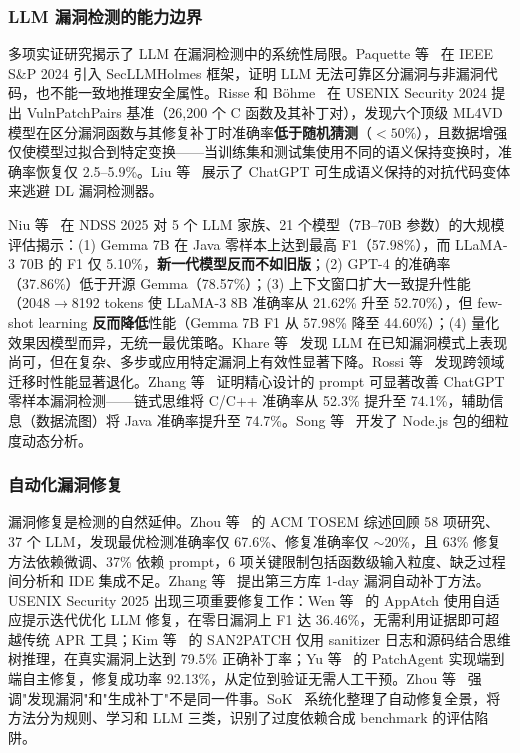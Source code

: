 \documentclass[11pt,a4paper,onecolumn]{article}
\begin{document}
\subsubsection{LLM 漏洞检测的能力边界}
多项实证研究揭示了 LLM 在漏洞检测中的系统性局限。Paquette 等~\cite{paquette2024llmscannot} 在 IEEE S\&P 2024 引入 SecLLMHolmes 框架，证明 LLM 无法可靠区分漏洞与非漏洞代码，也不能一致地推理安全属性。Risse 和 Böhme~\cite{risse2024limits} 在 USENIX Security 2024 提出 VulnPatchPairs 基准（26,200 个 C 函数及其补丁对），发现六个顶级 ML4VD 模型在区分漏洞函数与其修复补丁时准确率\textbf{低于随机猜测}（$<50\%$），且数据增强仅使模型过拟合到特定变换——当训练集和测试集使用不同的语义保持变换时，准确率恢复仅 2.5--5.9\%。Liu 等~\cite{liu2024eatvul} 展示了 ChatGPT 可生成语义保持的对抗代码变体来逃避 DL 漏洞检测器。

Niu 等~\cite{niu2025largetomammoth} 在 NDSS 2025 对 5 个 LLM 家族、21 个模型（7B--70B 参数）的大规模评估揭示：(1) Gemma 7B 在 Java 零样本上达到最高 F1（57.98\%），而 LLaMA-3 70B 的 F1 仅 5.10\%，\textbf{新一代模型反而不如旧版}；(2) GPT-4 的准确率（37.86\%）低于开源 Gemma（78.57\%）；(3) 上下文窗口扩大一致提升性能（2048$\to$8192 tokens 使 LLaMA-3 8B 准确率从 21.62\% 升至 52.70\%），但 few-shot learning \textbf{反而降低}性能（Gemma 7B F1 从 57.98\% 降至 44.60\%）；(4) 量化效果因模型而异，无统一最优策略。Khare 等~\cite{khare2025llmvulndet} 发现 LLM 在已知漏洞模式上表现尚可，但在复杂、多步或应用特定漏洞上有效性显著下降。Rossi 等~\cite{rossi2025crossdomain} 发现跨领域迁移时性能显著退化。Zhang 等~\cite{zhang2024prompt} 证明精心设计的 prompt 可显著改善 ChatGPT 零样本漏洞检测——链式思维将 C/C++ 准确率从 52.3\% 提升至 74.1\%，辅助信息（数据流图）将 Java 准确率提升至 74.7\%。Song 等~\cite{song2025nodemedic} 开发了 Node.js 包的细粒度动态分析。

\subsubsection{自动化漏洞修复}
漏洞修复是检测的自然延伸。Zhou 等~\cite{zhou2025vulndetrepair} 的 ACM TOSEM 综述回顾 58 项研究、37 个 LLM，发现最优检测准确率仅 67.6\%、修复准确率仅 $\sim$20\%，且 63\% 修复方法依赖微调、37\% 依赖 prompt，6 项关键限制包括函数级输入粒度、缺乏过程间分析和 IDE 集成不足。Zhang 等~\cite{zhang2025tplpatch} 提出第三方库 1-day 漏洞自动补丁方法。USENIX Security 2025 出现三项重要修复工作：Wen 等~\cite{wen2025appatch} 的 AppAtch 使用自适应提示迭代优化 LLM 修复，在零日漏洞上 F1 达 36.46\%，无需利用证据即可超越传统 APR 工具；Kim 等~\cite{kim2025san2patch} 的 SAN2PATCH 仅用 sanitizer 日志和源码结合思维树推理，在真实漏洞上达到 79.5\% 正确补丁率；Yu 等~\cite{yu2025patchagent} 的 PatchAgent 实现端到端自主修复，修复成功率 92.13\%，从定位到验证无需人工干预。Zhou 等~\cite{zhou_vuln_repair_2024} 强调"发现漏洞"和"生成补丁"不是同一件事。SoK~\cite{sok2025avr} 系统化整理了自动修复全景，将方法分为规则、学习和 LLM 三类，识别了过度依赖合成 benchmark 的评估陷阱。
\end{document}
